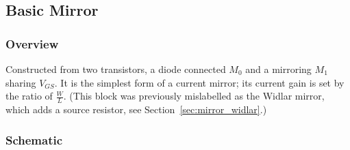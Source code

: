 \subsection{Basic Mirror}\label{sec:mirror_basic}

\subsubsection{Overview}
Constructed from two transistors, a diode connected
\(M_0\) and a mirroring \(M_1\) sharing \(V_{GS}\). It is the
simplest form of a current mirror; its current gain is set
by the ratio of \(\frac{W}{L}\). (This block was previously
mislabelled as the Widlar mirror, which adds a source
resistor, see Section~\ref{sec:mirror_widlar}.)

\subsubsection{Schematic}
